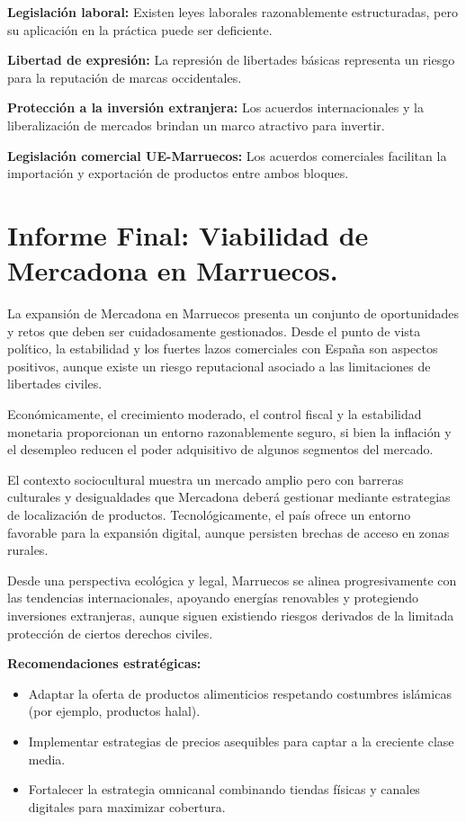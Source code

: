 \documentclass{article}  %
\begin{document}
\textbf{Legislación laboral:} Existen leyes laborales razonablemente
estructuradas, pero su aplicación en la práctica puede ser deficiente.

\textbf{Libertad de expresión:} La represión de libertades básicas
representa un riesgo para la reputación de marcas occidentales.

\textbf{Protección a la inversión extranjera:} Los acuerdos
internacionales y la liberalización de mercados brindan un marco
atractivo para invertir.

\textbf{Legislación comercial UE-Marruecos:} Los acuerdos comerciales
facilitan la importación y exportación de productos entre ambos bloques.

\section{Informe Final: Viabilidad de Mercadona en
Marruecos.}\label{informe-final-viabilidad-de-mercadona-en-marruecos.}

La expansión de Mercadona en Marruecos presenta un conjunto de
oportunidades y retos que deben ser cuidadosamente gestionados. Desde el
punto de vista político, la estabilidad y los fuertes lazos comerciales
con España son aspectos positivos, aunque existe un riesgo reputacional
asociado a las limitaciones de libertades civiles.

Económicamente, el crecimiento moderado, el control fiscal y la
estabilidad monetaria proporcionan un entorno razonablemente seguro, si
bien la inflación y el desempleo reducen el poder adquisitivo de algunos
segmentos del mercado.

El contexto sociocultural muestra un mercado amplio pero con barreras
culturales y desigualdades que Mercadona deberá gestionar mediante
estrategias de localización de productos. Tecnológicamente, el país
ofrece un entorno favorable para la expansión digital, aunque persisten
brechas de acceso en zonas rurales.

Desde una perspectiva ecológica y legal, Marruecos se alinea
progresivamente con las tendencias internacionales, apoyando energías
renovables y protegiendo inversiones extranjeras, aunque siguen
existiendo riesgos derivados de la limitada protección de ciertos
derechos civiles.

\textbf{Recomendaciones estratégicas:}


\begin{itemize}
\item
  Adaptar la oferta de productos alimenticios respetando costumbres
  islámicas (por ejemplo, productos halal).
\item
  Implementar estrategias de precios asequibles para captar a la
  creciente clase media.
\item
  Fortalecer la estrategia omnicanal combinando tiendas físicas y
  canales digitales para maximizar cobertura.
\end{itemize}
\end{document}
